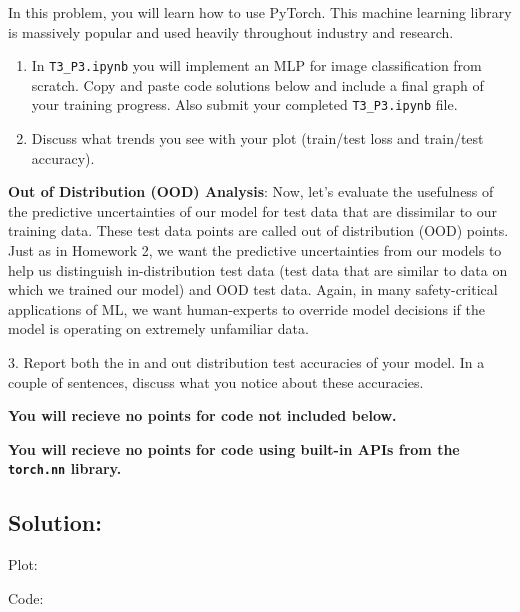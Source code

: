\documentclass[submit]{harvardml}
\begin{document}
\begin{problem}

In this problem, you will learn how to use PyTorch. This machine learning library is massively popular and used heavily throughout industry and research. 


\begin{enumerate}
    \item In \verb|T3_P3.ipynb| you will implement an MLP for image classification from scratch. Copy and paste code solutions below and include a final graph of your training progress. Also submit your completed \verb|T3_P3.ipynb| file.
    \item Discuss what trends you see with your plot (train/test loss and train/test accuracy).
\end{enumerate}

\textbf{Out of Distribution (OOD) Analysis}: Now, let's evaluate the usefulness of the predictive uncertainties of our model for test data that are dissimilar to our training data. These test data points are called out of distribution (OOD) points. Just as in Homework 2, we want the predictive uncertainties from our models to help us distinguish in-distribution test data (test data that are similar to data on which we trained our model) and OOD test data. Again, in many safety-critical applications of ML, we want human-experts to override model decisions if the model is operating on extremely unfamiliar data. 

\hspace{3mm} 3. Report both the in and out distribution test accuracies of your model. In a couple of sentences, discuss what you notice about these accuracies.

  {\bfseries You will recieve no points for code not included below.}

  {\bfseries You will recieve no points for code using built-in APIs from the \verb|torch.nn| library.}
  
\end{problem}


\subsection*{Solution:}
Plot:


Code:
\end{document}
